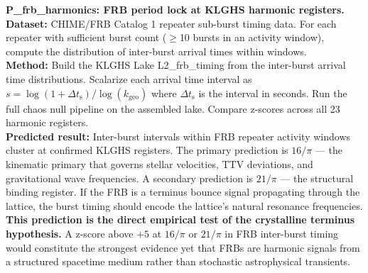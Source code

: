\documentclass[11pt, letterpaper, openany]{book}
\begin{document}
\begin{predictionbox}
\textbf{P\_frb\_harmonics: FRB period lock at KLGHS harmonic registers.}\\[0.5em]
\textbf{Dataset:} CHIME/FRB Catalog 1 repeater sub-burst timing data.
For each repeater with sufficient burst count ($\geq$10 bursts in an
activity window), compute the distribution of inter-burst arrival times
within windows.\\[0.5em]
\textbf{Method:} Build the KLGHS Lake L2\_frb\_timing from the inter-burst
arrival time distributions. Scalarize each arrival time interval as
$s = \log(1 + \Delta t_\text{s}) / \log(k_\text{geo})$ where $\Delta t_\text{s}$
is the interval in seconds. Run the full chaos null pipeline on the
assembled lake. Compare z-scores across all 23 harmonic registers.\\[0.5em]
\textbf{Predicted result:} Inter-burst intervals within FRB repeater activity
windows cluster at confirmed KLGHS registers. The primary prediction is
$16/\pi$ --- the kinematic primary that governs stellar velocities, TTV
deviations, and gravitational wave frequencies. A secondary prediction is
$21/\pi$ --- the structural binding register. If the FRB is a terminus
bounce signal propagating through the lattice, the burst timing should
encode the lattice's natural resonance frequencies.\\[0.5em]
\textbf{This prediction is the direct empirical test of the crystalline
terminus hypothesis.} A z-score above $+5$ at $16/\pi$ or $21/\pi$ in
FRB inter-burst timing would constitute the strongest evidence yet that
FRBs are harmonic signals from a structured spacetime medium rather than
stochastic astrophysical transients.
\end{predictionbox}
\end{document}
